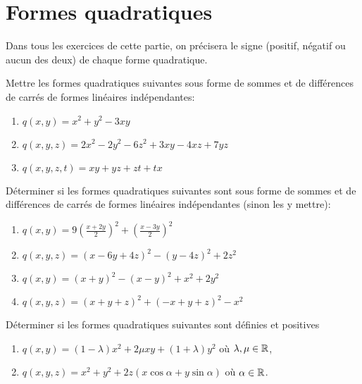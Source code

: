\documentclass{tp_um}
\begin{document}
\newpage

\section{Formes quadratiques}

Dans tous les exercices de cette partie, on précisera le signe (positif, négatif ou aucun des deux) de chaque forme quadratique.



\exo{} Mettre les formes quadratiques suivantes sous forme de sommes et de différences de carrés de formes linéaires indépendantes: 
\begin{enumerate}
	\item $q(x,y) = x^2 + y^2 -3xy$ 
	\item $q(x,y,z) = 2x^2 - 2y^2 - 6z^2 + 3xy - 4 xz + 7 yz$
	\item $q(x,y,z,t) = xy+yz+zt+tx$ %
\end{enumerate}

\newpage

\exo{} Déterminer si les formes quadratiques suivantes sont sous forme de sommes et de différences de carrés de formes linéaires indépendantes (sinon les y mettre):   
\begin{enumerate}
	\item $q(x,y) = 9\left( \frac{x+2y}{2} \right)^2 + \left( \frac{x - 3y}{2} \right)^2$
	\item $q(x,y,z) = (x-6y+4z)^2 - (y-4z)^2 + 2z^2$
	\item $q(x,y) = (x+y)^2 - (x - y)^2 + x^2 +2y^2$
	\item $q(x,y,z) = (x+y+z)^2 + (-x +y +z)^2 - x^2 $
\end{enumerate}

\newpage


\exo[*]{} Déterminer si les formes quadratiques suivantes sont définies et positives
\begin{enumerate}
\item $q(x,y) = (1-\lambda)x^2 + 2\mu xy + (1+\lambda)y^2$ où $\lambda,\mu\in\mathbb{R}$,
\item $q(x,y,z) = x^2 + y^2 + 2z(x\cos\alpha + y\sin \alpha)$ où $\alpha\in\mathbb{R}$.
\end{enumerate}
\end{document}
